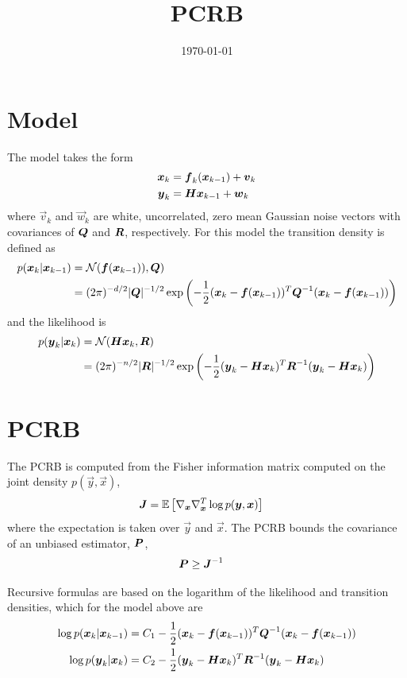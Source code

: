\documentclass{article}
\title{PCRB}
\date{\today}
\begin{document}
\section{Model}

The model takes the form
\begin{subequations}
\begin{align}
	{\boldsymbol x}_k &= {\boldsymbol f}_k({\boldsymbol x}_{k-1}) + {\boldsymbol v}_k \\
	{\boldsymbol y}_k &= \boldsymbol{H}{\boldsymbol x}_{k-1} + {\boldsymbol w}_k
\end{align}
\label{eqn:model_general}
\end{subequations}
where $\vec v_k$ and $\vec w_k$ are white, uncorrelated, zero mean Gaussian noise vectors with covariances of $\boldsymbol{Q}$ and $\boldsymbol{R}$, respectively. For this model the transition density is defined as
\begin{align}
	p({\boldsymbol x}_k|{\boldsymbol x}_{k-1}) &= \mathcal N({\boldsymbol f}({\boldsymbol x}_{k-1})),\boldsymbol{Q}) \\
	&= (2\pi)^{-d/2} |\boldsymbol{Q}|^{-1/2} \exp\left(-\frac{1}{2}({\boldsymbol x}_k - {\boldsymbol f}({\boldsymbol x}_{k-1}))^T \boldsymbol{Q}^{-1} ({\boldsymbol x}_k - {\boldsymbol f}({\boldsymbol x}_{k-1})) \right)
\end{align}
and the likelihood is
\begin{align}
	p({\boldsymbol y}_k|{\boldsymbol x}_k) &= \mathcal N(\boldsymbol{H}{\boldsymbol x}_k,\boldsymbol{R}) \\
	&= (2\pi)^{-n/2} |\boldsymbol{R}|^{-1/2} \exp\left(-\frac{1}{2}({\boldsymbol y}_k - \boldsymbol{H}{\boldsymbol x}_k)^T \boldsymbol{R}^{-1} ({\boldsymbol y}_k - \boldsymbol{H}{\boldsymbol x}_k) \right)
\end{align}

\section{PCRB}

The PCRB is computed from the Fisher information matrix computed on the joint density $p(\vec y,\vec x)$,
\begin{align}
	\boldsymbol{J} &= \mathbb E\left[ \nabla_{{\boldsymbol x}}\nabla_{{\boldsymbol x}}^T \log p({\boldsymbol y},{\boldsymbol x}) \right]
\end{align}
where the expectation is taken over $\vec y$ and $\vec x$. The PCRB bounds the covariance of an unbiased estimator, $\boldsymbol{P}$,
\begin{align}
	\boldsymbol{P} &\ge \boldsymbol{J}^{-1}
\end{align}


Recursive formulas are based on the logarithm of the likelihood and transition densities, which for the model above are
\begin{align}
	\log p({\boldsymbol x}_k|{\boldsymbol x}_{k-1}) &= C_1 -\frac{1}{2}({\boldsymbol x}_k - {\boldsymbol f}({\boldsymbol x}_{k-1}))^T \boldsymbol{Q}^{-1} ({\boldsymbol x}_k - {\boldsymbol f}({\boldsymbol x}_{k-1})) \\
	\log p({\boldsymbol y}_k|{\boldsymbol x}_k) &= C_2 -\frac{1}{2}({\boldsymbol y}_k - \boldsymbol{H}{\boldsymbol x}_k)^T \boldsymbol{R}^{-1} ({\boldsymbol y}_k - \boldsymbol{H}{\boldsymbol x}_k)
\end{align}
\end{document}
